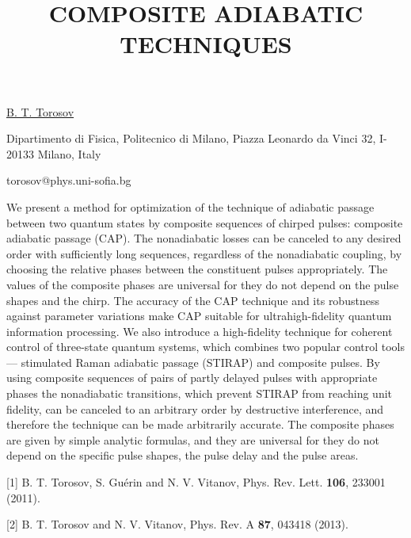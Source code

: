 \title{COMPOSITE ADIABATIC TECHNIQUES}

\underline{B. T. Torosov}

{\normalsize{

\vspace{-4mm} Dipartimento di Fisica, Politecnico di Milano, Piazza Leonardo da Vinci 32, I-20133 Milano, Italy



\email torosov@phys.uni-sofia.bg}}

We present a method for optimization of the technique of adiabatic passage between two quantum states by composite sequences of chirped pulses: composite adiabatic passage (CAP). The nonadiabatic losses can be canceled to any desired order with sufficiently long sequences, regardless of the nonadiabatic coupling, by choosing the relative phases between the constituent pulses appropriately. The values of the composite phases are universal for they do not depend on the pulse shapes and the chirp. The accuracy of the CAP technique and its robustness against parameter variations make CAP suitable for ultrahigh-fidelity quantum information processing. We also introduce a high-fidelity technique for coherent control of three-state quantum systems, which combines two popular control tools --- stimulated Raman adiabatic passage (STIRAP) and composite pulses. By using composite sequences of pairs of partly delayed pulses with appropriate phases the nonadiabatic transitions, which prevent STIRAP from reaching unit fidelity, can be canceled to an arbitrary order by destructive interference, and therefore the technique can be made arbitrarily accurate. The composite phases are given by simple analytic formulas, and they are universal for they do not depend on the specific pulse shapes, the pulse delay and the pulse areas.

{\normalsize
[1] B. T. Torosov, S. Gu\'{e}rin and N. V. Vitanov, Phys. Rev. Lett. \textbf{106}, 233001 (2011).
\vsp

[2] B. T. Torosov and N. V. Vitanov, Phys. Rev. A \textbf{87}, 043418 (2013).
}

\vspace{\baselineskip}

